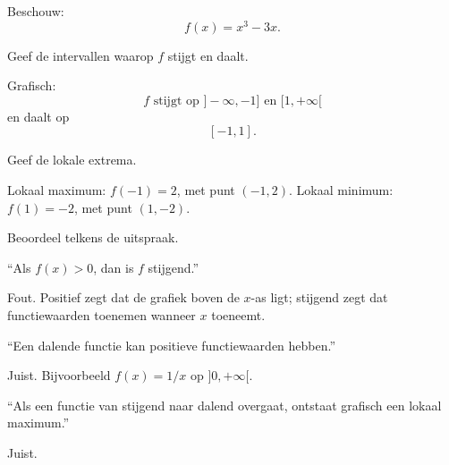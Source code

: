 \documentclass{ximera}
\begin{document}
\begin{oefening}{\oefB\ESS}

Beschouw:
\[
f(x)=x^3-3x.
\]

\begin{center}
\end{center}

\begin{question}
Geef de intervallen waarop \(f\) stijgt en daalt.
\begin{oplossing}
Grafisch:
\[
f\text{ stijgt op }]-\infty,-1]\text{ en }[1,+\infty[
\]
en daalt op
\[
[-1,1].
\]
\end{oplossing}
\end{question}

\begin{question}
Geef de lokale extrema.
\begin{oplossing}
Lokaal maximum: \(f(-1)=2\), met punt \((-1,2)\).
Lokaal minimum: \(f(1)=-2\), met punt \((1,-2)\).
\end{oplossing}
\end{question}
\end{oefening}

\begin{oefening}{\oefB\ESS}

Beoordeel telkens de uitspraak.

\begin{question}
``Als \(f(x)>0\), dan is \(f\) stijgend.''
\begin{oplossing}
Fout. Positief zegt dat de grafiek boven de \(x\)-as ligt; stijgend zegt
dat functiewaarden toenemen wanneer \(x\) toeneemt.
\end{oplossing}
\end{question}

\begin{question}
``Een dalende functie kan positieve functiewaarden hebben.''
\begin{oplossing}
Juist. Bijvoorbeeld \(f(x)=1/x\) op \(]0,+\infty[\).
\end{oplossing}
\end{question}

\begin{question}
``Als een functie van stijgend naar dalend overgaat, ontstaat grafisch een lokaal maximum.''
\begin{oplossing}
Juist.
\end{oplossing}
\end{question}
\end{oefening}
\end{document}
